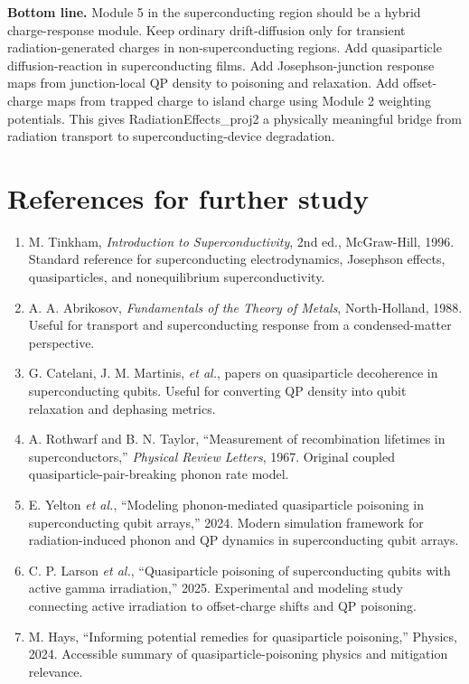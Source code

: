 \documentclass[11pt]{article}
\begin{document}
\begin{overviewbox}
\textbf{Bottom line.} Module 5 in the superconducting region should be a hybrid charge-response module. Keep ordinary drift-diffusion only for transient radiation-generated charges in non-superconducting regions. Add quasiparticle diffusion-reaction in superconducting films. Add Josephson-junction response maps from junction-local QP density to poisoning and relaxation. Add offset-charge maps from trapped charge to island charge using Module 2 weighting potentials. This gives RadiationEffects\_proj2 a physically meaningful bridge from radiation transport to superconducting-device degradation.
\end{overviewbox}

\section*{References for further study}

\begin{enumerate}[leftmargin=2em]
\item M. Tinkham, \emph{Introduction to Superconductivity}, 2nd ed., McGraw-Hill, 1996. Standard reference for superconducting electrodynamics, Josephson effects, quasiparticles, and nonequilibrium superconductivity.
\item A. A. Abrikosov, \emph{Fundamentals of the Theory of Metals}, North-Holland, 1988. Useful for transport and superconducting response from a condensed-matter perspective.
\item G. Catelani, J. M. Martinis, \emph{et al.}, papers on quasiparticle decoherence in superconducting qubits. Useful for converting QP density into qubit relaxation and dephasing metrics.
\item A. Rothwarf and B. N. Taylor, ``Measurement of recombination lifetimes in superconductors,'' \emph{Physical Review Letters}, 1967. Original coupled quasiparticle-pair-breaking phonon rate model.
\item E. Yelton \emph{et al.}, ``Modeling phonon-mediated quasiparticle poisoning in superconducting qubit arrays,'' 2024. Modern simulation framework for radiation-induced phonon and QP dynamics in superconducting qubit arrays.
\item C. P. Larson \emph{et al.}, ``Quasiparticle poisoning of superconducting qubits with active gamma irradiation,'' 2025. Experimental and modeling study connecting active irradiation to offset-charge shifts and QP poisoning.
\item M. Hays, ``Informing potential remedies for quasiparticle poisoning,'' Physics, 2024. Accessible summary of quasiparticle-poisoning physics and mitigation relevance.
\end{enumerate}
\end{document}
